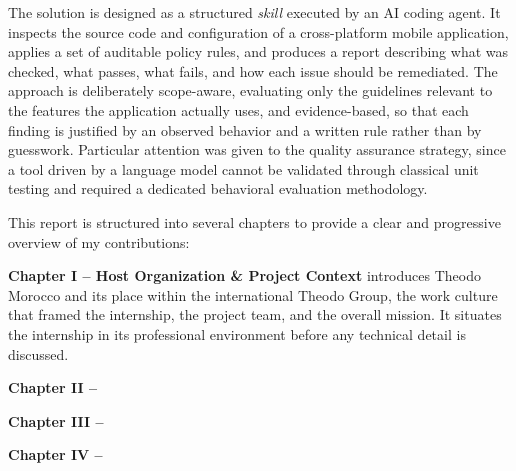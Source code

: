 The solution is designed as a structured \textit{skill} executed by an AI coding agent. It inspects the source code and configuration of a cross-platform mobile application, applies a set of auditable policy rules, and produces a report describing what was checked, what passes, what fails, and how each issue should be remediated. The approach is deliberately scope-aware, evaluating only the guidelines relevant to the features the application actually uses, and evidence-based, so that each finding is justified by an observed behavior and a written rule rather than by guesswork. Particular attention was given to the quality assurance strategy, since a tool driven by a language model cannot be validated through classical unit testing and required a dedicated behavioral evaluation methodology.

\vspace{0.5cm}

This report is structured into several chapters to provide a clear and progressive overview of my contributions:

\vspace{0.3cm}

\noindent\textbf{Chapter I -- Host Organization \& Project Context} introduces Theodo Morocco and its place within the international Theodo Group, the work culture that framed the internship, the project team, and the overall mission. It situates the internship in its professional environment before any technical detail is discussed.

\vspace{0.2cm}

\noindent\textbf{Chapter II -- } 

\vspace{0.2cm}

\noindent\textbf{Chapter III -- } 

\vspace{0.2cm}

\noindent\textbf{Chapter IV -- }

\vspace{1cm}
